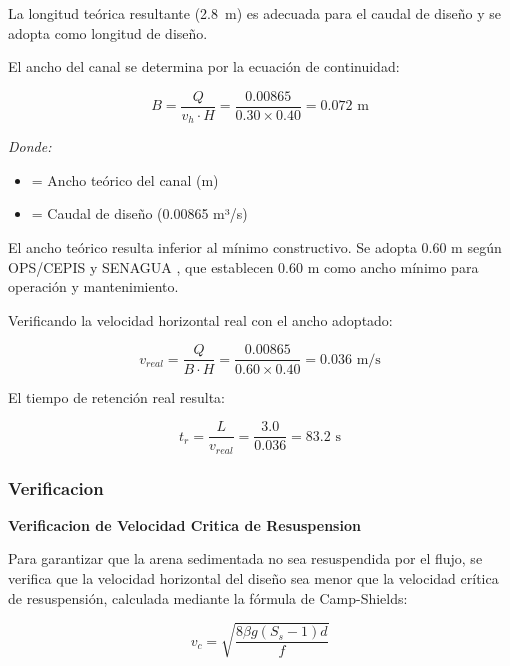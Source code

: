 \documentclass[12pt,a4paper]{article}
\begin{document}
La longitud te\'orica resultante (2.8~m) es adecuada para el caudal de dise\~no y se adopta como longitud de dise\~no.

El ancho del canal se determina por la ecuaci\'on de continuidad:

\begin{equation}
B = \frac{Q}{v_h \cdot H} = \frac{0.00865}{0.30 \times 0.40} = 0.072 \text{ m}
\end{equation}

\textit{Donde:}
\begin{itemize}[noitemsep,leftmargin=2em]
    \item[$B$] = Ancho te\'orico del canal (m)
    \item[$Q$] = Caudal de dise\~no (0.00865 m³/s)
\end{itemize}

El ancho te\'orico resulta inferior al m\'inimo constructivo. Se adopta 0.60 m seg\'un OPS/CEPIS \cite{ops2005} y SENAGUA \cite{senagua2012}, que establecen 0.60 m como ancho m\'inimo para operaci\'on y mantenimiento.

Verificando la velocidad horizontal real con el ancho adoptado:

\begin{equation}
v_{real} = \frac{Q}{B \cdot H} = \frac{0.00865}{0.60 \times 0.40} = 0.036 \text{ m/s}
\end{equation}

El tiempo de retenci\'on real resulta:

\begin{equation}
t_r = \frac{L}{v_{real}} = \frac{3.0}{0.036} = 83.2 \text{ s}
\end{equation}

\subsubsection{Verificacion}

\textbf{Verificacion de Velocidad Critica de Resuspension}

Para garantizar que la arena sedimentada no sea resuspendida por el flujo, se verifica que la velocidad horizontal del dise\~no sea menor que la velocidad cr\'itica de resuspensi\'on, calculada mediante la f\'ormula de Camp-Shields:

\begin{equation}
v_c = \sqrt{\frac{8 \beta g (S_s - 1) d}{f}}
\end{equation}
\end{document}
